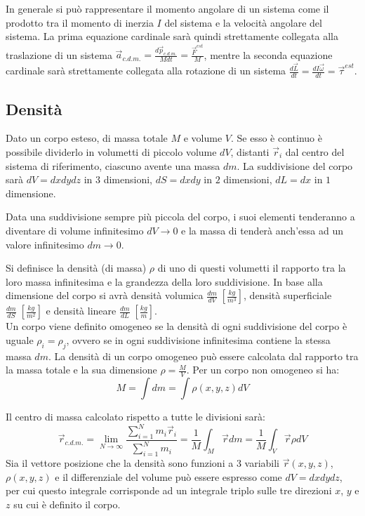 \documentclass{article}
\numberwithin{equation}{subsection}
\begin{document}
In generale si può rappresentare il momento angolare di un sistema 
come il prodotto tra il momento di inerzia $I$ del sistema e la velocità angolare del sistema. 
La prima equazione cardinale sarà quindi strettamente collegata 
alla traslazione di un sistema $\vec{a}_{c.d.m.}=\displaystyle\frac{d\vec{p}_{c.d.m.}}{Mdt}=\frac{\vec{F}^{est}}{M}$, 
mentre la seconda equazione cardinale sarà strettamente 
collegata alla rotazione di un sistema $\displaystyle\frac{d\vec{L}}{dt}=\frac{dI\vec{\omega}}{dt}=\vec{\tau}^{est}$. 

\subsection{Densità}

Dato un corpo esteso, di massa totale $M$ e volume $V$. Se esso è continuo è possibile dividerlo 
in volumetti di piccolo volume $dV$, distanti $\vec{r}_i$ dal centro del sistema di 
riferimento, ciascuno avente una massa $dm$. La suddivisione del corpo sarà 
$dV=dxdydz$ in $3$ dimensioni, $dS=dxdy$ in $2$ dimensioni, 
$dL=dx$ in $1$ dimensione. 

Data una suddivisione sempre più piccola del corpo, i suoi elementi tenderanno a diventare di volume infinitesimo $dV\to 0$ e 
la massa di tenderà anch'essa ad un valore infinitesimo $dm\to 0$.

Si definisce la densità (di massa) $\rho$ di uno 
di questi volumetti il rapporto tra la loro massa infinitesima e la 
grandezza della loro suddivisione. In base alla dimensione 
del corpo si avrà densità volumica $\displaystyle\frac{dm}{dV}\;\left[\displaystyle\frac{kg}{m^3}\right]$, 
densità superficiale $\displaystyle\frac{dm}{dS}\;\left[\displaystyle\frac{kg}{m^2}\right]$ e densità 
lineare $\displaystyle\frac{dm}{dL}\;\left[\displaystyle\frac{kg}{m}\right]$. 
\\
Un corpo viene definito omogeneo se la densità di ogni 
suddivisione del corpo è uguale $\rho_i=\rho_j$, ovvero se in ogni suddivisione infinitesima contiene la stessa massa $dm$. 
La densità di un corpo omogeneo può essere calcolata dal rapporto 
tra la massa totale e la sua dimensione $\rho=\displaystyle\frac{M}{V}$. 
Per un corpo non omogeneo si ha: 
\begin{equation}
    M=\displaystyle\int dm=\int \rho(x,y,z) dV 
\end{equation}


Il centro di 
massa calcolato rispetto a tutte le divisioni sarà: 
\begin{equation}
    \vec{r}_{c.d.m.}=\lim_{N\to\infty}\displaystyle\frac{\sum_{i=1}^{N}m_i\vec{r}_i}{\sum_{i=1}^{N}m_i}=\displaystyle\frac{1}{M}\int_M\vec{r}dm=\displaystyle\frac{1}{M}\int_V\vec{r}\rho dV
\end{equation}
Sia il vettore posizione che la densità sono funzioni a $3$ variabili $\vec{r}(x,y,z)$, $\rho(x,y,z)$ e il differenziale del volume può essere espresso come $dV=dxdydz$, per cui questo integrale corrisponde 
ad un integrale triplo sulle tre direzioni $x$, $y$ e $z$ su cui è definito il corpo. 
\end{document}
